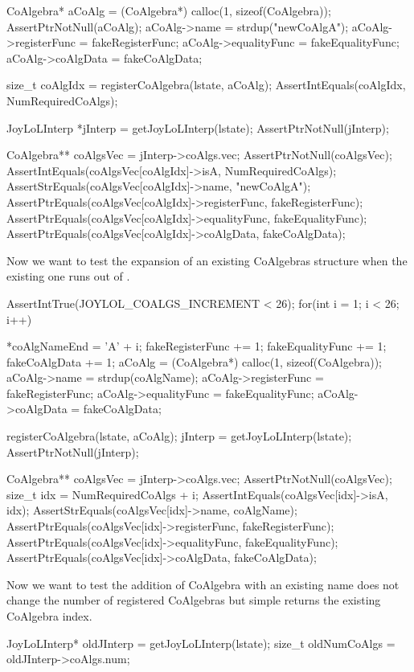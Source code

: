   CoAlgebra* aCoAlg    = (CoAlgebra*) calloc(1, sizeof(CoAlgebra));
  AssertPtrNotNull(aCoAlg);
  aCoAlg->name         = strdup("newCoAlgA");
  aCoAlg->registerFunc = fakeRegisterFunc;
  aCoAlg->equalityFunc = fakeEqualityFunc;
  aCoAlg->coAlgData    = fakeCoAlgData;
  
  size_t coAlgIdx = registerCoAlgebra(lstate, aCoAlg);
  AssertIntEquals(coAlgIdx, NumRequiredCoAlgs);
  
  JoyLoLInterp *jInterp = getJoyLoLInterp(lstate);
  AssertPtrNotNull(jInterp);

  CoAlgebra** coAlgsVec = jInterp->coAlgs.vec;
  AssertPtrNotNull(coAlgsVec);
  AssertIntEquals(coAlgsVec[coAlgIdx]->isA, NumRequiredCoAlgs);
  AssertStrEquals(coAlgsVec[coAlgIdx]->name, "newCoAlgA");
  AssertPtrEquals(coAlgsVec[coAlgIdx]->registerFunc, fakeRegisterFunc);
  AssertPtrEquals(coAlgsVec[coAlgIdx]->equalityFunc, fakeEqualityFunc);
  AssertPtrEquals(coAlgsVec[coAlgIdx]->coAlgData,    fakeCoAlgData);
\stopCTest

Now we want to test the expansion of an existing CoAlgebras structure when 
the existing one runs out of . 

\startCTest
  AssertIntTrue(JOYLOL_COALGS_INCREMENT < 26);
  for(int i = 1; i < 26; i++) {
    *coAlgNameEnd        = 'A' + i;
    fakeRegisterFunc    += 1;
    fakeEqualityFunc    += 1;
    fakeCoAlgData       += 1;
    aCoAlg               = (CoAlgebra*) calloc(1, sizeof(CoAlgebra));
    aCoAlg->name         = strdup(coAlgName);
    aCoAlg->registerFunc = fakeRegisterFunc;
    aCoAlg->equalityFunc = fakeEqualityFunc;
    aCoAlg->coAlgData    = fakeCoAlgData;
    
    registerCoAlgebra(lstate, aCoAlg);
    jInterp = getJoyLoLInterp(lstate);
    AssertPtrNotNull(jInterp);

    CoAlgebra** coAlgsVec = jInterp->coAlgs.vec;
    AssertPtrNotNull(coAlgsVec);
    size_t idx = NumRequiredCoAlgs + i;
    AssertIntEquals(coAlgsVec[idx]->isA, idx);
    AssertStrEquals(coAlgsVec[idx]->name, coAlgName);
    AssertPtrEquals(coAlgsVec[idx]->registerFunc, fakeRegisterFunc);
    AssertPtrEquals(coAlgsVec[idx]->equalityFunc, fakeEqualityFunc);
    AssertPtrEquals(coAlgsVec[idx]->coAlgData,    fakeCoAlgData);
  }
\stopCTest

Now we want to test the addition of CoAlgebra with an existing name does 
not change the number of registered CoAlgebras but simple returns the 
existing CoAlgebra index. 

\startCTest
  JoyLoLInterp* oldJInterp = getJoyLoLInterp(lstate);
  size_t oldNumCoAlgs  = oldJInterp->coAlgs.num;
  

